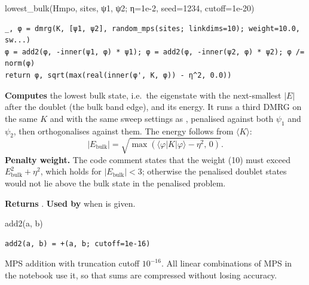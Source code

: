 \documentclass[11pt]{article}
\newcommand{\ket}[1]{\lvert #1\rangle}
\newcommand{\bra}[1]{\langle #1\rvert}
\begin{document}
\begin{function}{lowest\_bulk(Hmpo, sites, ψ1, ψ2; η=1e-2, seed=1234, cutoff=1e-20)}
\begin{Verbatim}
_, φ = dmrg(K, [ψ1, ψ2], random_mps(sites; linkdims=10); weight=10.0, sw...)
φ = add2(φ, -inner(ψ1, φ) * ψ1); φ = add2(φ, -inner(ψ2, φ) * ψ2); φ /= norm(φ)
return φ, sqrt(max(real(inner(φ', K, φ)) - η^2, 0.0))
\end{Verbatim}
\textbf{Computes} the lowest bulk state, i.e.\ the eigenstate with the next-smallest $|E|$ after the doublet (the
bulk band edge), and its energy. It runs a third DMRG on the same $K$ and with the same sweep settings as
, penalised against both $\psi_1$ and $\psi_2$, then orthogonalises against them. The energy follows
from $\langle K\rangle$:
\[
  |E_{\text{bulk}}| = \sqrt{\max(\bra{\varphi}K\ket{\varphi} - \eta^2,\,0)} .
\]
\textbf{Penalty weight.} The code comment states that the weight (10) must exceed $E_{\text{bulk}}^2+\eta^2$, which
holds for $|E_{\text{bulk}}|<3$; otherwise the penalised doublet states would not lie above the bulk state in the
penalised problem.

\textbf{Returns} . \textbf{Used by}  when  is given.
\end{function}

\begin{function}{add2(a, b)}
\begin{Verbatim}
add2(a, b) = +(a, b; cutoff=1e-16)
\end{Verbatim}
MPS addition with truncation cutoff $10^{-16}$. All linear combinations of MPS in the notebook use it, so that sums
are compressed without losing accuracy.
\end{function}
\end{document}
